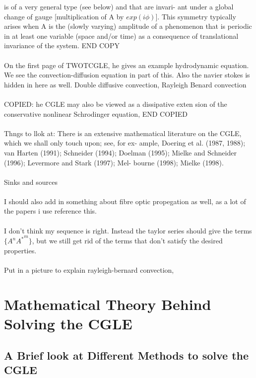 \documentclass[a4paper,12pt]{report}
\begin{document}
is of a very general type (see below) and that are invari-
ant under a global change of gauge [multiplication of A
by $exp(i\phi)]$. This symmetry typically arises when A is
the (slowly varying) amplitude of a phenomenon that is
periodic in at least one variable (space and/or time) as a
consequence of translational invariance of the system.
END COPY
\\\\
On the first page of TWOTCGLE, he gives an example hydrodynamic equation. We see the convection-diffusion equation in part of this. Also the navier stokes is hidden in here as well. Double diffusive convection, Rayleigh Benard convection
\\\\
COPIED:
he CGLE may also be viewed as a dissipative exten
sion of the conservative nonlinear Schrodinger equation,
END COPIED
\\\\
Thngs to llok at:
There is an extensive mathematical literature on the
CGLE, which we shall only touch upon; see, for ex-
ample, Doering et al. (1987, 1988); van Harten (1991);
Schneider (1994); Doelman (1995); Mielke and
Schneider (1996); Levermore and Stark (1997); Mel-
bourne (1998); Mielke (1998).
\\\\
Sinks and sources
\\\\
I should also add in something about fibre optic propegation as well, as a lot of the papers i use reference this.
\\\\
I don't think my sequence is right. Instead the taylor series should give the terms $\{A^n {A^*} ^m\}$, but we still get rid of the terms that don't satisfy the desired properties.
\\\\
Put in a picture to explain rayleigh-bernard convection, 


\chapter{Mathematical Theory Behind Solving the CGLE}

\section{A Brief look at Different Methods to solve the CGLE}
\end{document}
